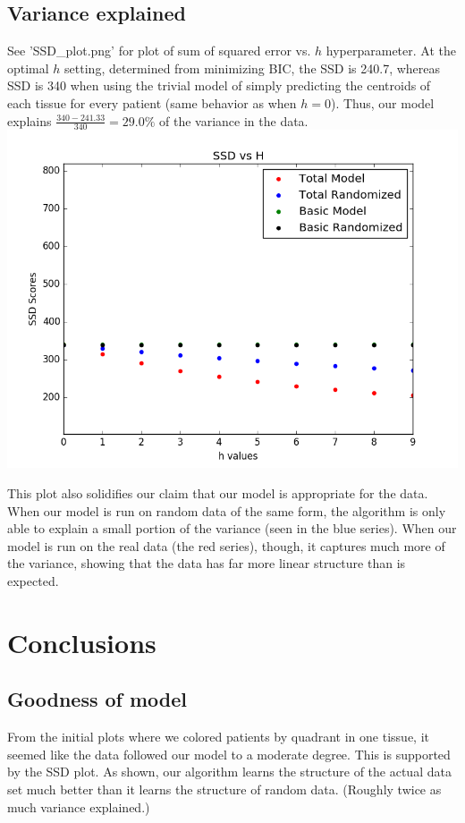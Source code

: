 \documentclass{article}
\begin{document}
\subsection{Variance explained}
See 'SSD\_plot.png' for plot of sum of squared error vs. $h$ hyperparameter. At the optimal $h$ setting, determined from minimizing BIC, the SSD is 240.7, whereas SSD is 340 when using the trivial model of simply predicting the centroids of each tissue for every patient (same behavior as when $h = 0$). Thus, our model explains $\frac{340 - 241.33}{340} = 29.0\%$ of the variance in the data. \\
\includegraphics[scale = 0.6]{SSD_Scores.png}

This plot also solidifies our claim that our model is appropriate for the data. When our model is run on random data of the same form, the algorithm is only able to explain a small portion of the variance (seen in the blue series). When our model is run on the real data (the red series), though, it captures much more of the variance, showing that the data has far more linear structure than is expected. \\


\section{Conclusions} %

\subsection{Goodness of model}
From the initial plots where we colored patients by quadrant in one tissue, it seemed like the data followed our model to a moderate degree. This is supported by the SSD plot. As shown, our algorithm learns the structure of the actual data set much better than it learns the structure of random data. (Roughly twice as much variance explained.)
\end{document}
